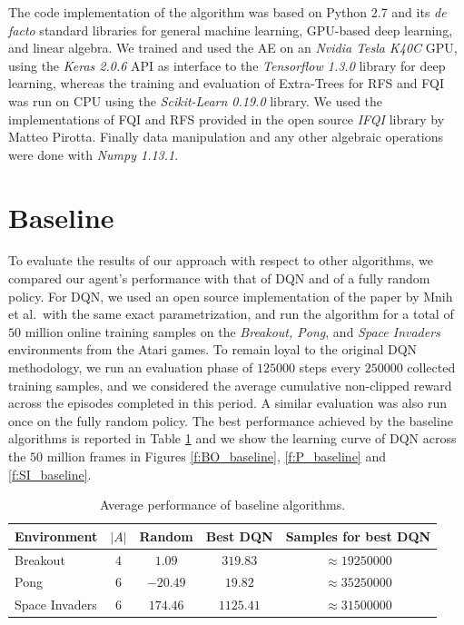 The code implementation of the algorithm was based on Python 2.7 and its 
\textit{de facto} standard libraries for general machine learning, GPU-based 
deep learning, and linear algebra. 
We trained and used the AE on an \textit{Nvidia Tesla K40C} GPU, using the 
\textit{Keras 2.0.6} API as interface to the \textit{Tensorflow 1.3.0} library 
for deep learning, whereas the training and evaluation of Extra-Trees 
for RFS and FQI was run on CPU using the \textit{Scikit-Learn 0.19.0} library.
We used the implementations of FQI and RFS provided in the open source 
\textit{IFQI} library by Matteo Pirotta.
Finally data manipulation and any other algebraic operations were done with 
\textit{Numpy 1.13.1}.

\section{Baseline}\label{s:exp_baseline}
To evaluate the results of our approach with respect to other algorithms, we 
compared our agent's performance with that of DQN \cite{mnih2015human} and of a 
fully random policy. 
For DQN, we used an open source implementation of the paper by Mnih et al.\  
with the same exact parametrization, and run the algorithm for a total of $50$ 
million online training samples on the \textit{Breakout, Pong}, and 
\textit{Space Invaders} environments from the Atari games.
To remain loyal to the original DQN methodology, we run an evaluation phase 
of $125000$ steps every $250000$ collected training samples, and we considered
the average cumulative non-clipped reward across the episodes completed in
this period. A similar evaluation was also run once on the fully random policy.
The best performance achieved by the baseline algorithms is reported in Table 
\ref{t:envs_used} and we show the learning curve of DQN across the $50$ million
frames in Figures \ref{f:BO_baseline}, \ref{f:P_baseline} and \ref{f:SI_baseline}.
%
\begin{table}[b]
    \centering
    \begin{tabular}{l c c c c} 
	\hline
	Environment    & $|A|$ & Random   & Best DQN  & Samples for best DQN \\ 
	\hline 
	Breakout       & $4$   & $1.09$   & $319.83$  & $\approx19250000$ \\
	Pong           & $6$   & $-20.49$ & $19.82$   & $\approx35250000$ \\
	Space Invaders & $6$   & $174.46$ & $1125.41$ & $\approx31500000$ \\
	\hline
    \end{tabular}
    \caption[Performance of baseline algorithms]{Average performance of baseline
	     algorithms.}
    \label{t:envs_used}
\end{table}
